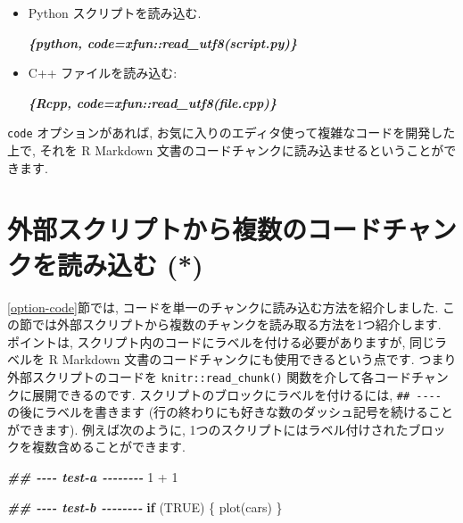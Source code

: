 \documentclass[
  11pt,
  lualatex,
  ja=standard]{bxjsreport}
\newenvironment{Shaded}{\begin{snugshade}}{\end{snugshade}}
\newcommand{\ConstantTok}[1]{\textcolor[rgb]{0.00,0.00,0.00}{#1}}
\newcommand{\ControlFlowTok}[1]{\textcolor[rgb]{0.13,0.29,0.53}{\textbf{#1}}}
\newcommand{\DecValTok}[1]{\textcolor[rgb]{0.00,0.00,0.81}{#1}}
\newcommand{\DocumentationTok}[1]{\textcolor[rgb]{0.56,0.35,0.01}{\textbf{\textit{#1}}}}
\newcommand{\FunctionTok}[1]{\textcolor[rgb]{0.00,0.00,0.00}{#1}}
\newcommand{\InformationTok}[1]{\textcolor[rgb]{0.56,0.35,0.01}{\textbf{\textit{#1}}}}
\newcommand{\NormalTok}[1]{#1}
\newcommand{\SpecialCharTok}[1]{\textcolor[rgb]{0.00,0.00,0.00}{#1}}
\begin{document}
\begin{itemize}
\item
  Python スクリプトを読み込む.

\begin{Shaded}
\begin{Highlighting}[]
\InformationTok{\textasciigrave{}\textasciigrave{}\textasciigrave{}\{python, code=xfun::read\_utf8(\textquotesingle{}script.py\textquotesingle{})\}}
\InformationTok{\textasciigrave{}\textasciigrave{}\textasciigrave{}}
\end{Highlighting}
\end{Shaded}
\item
  C++ ファイルを読み込む:

\begin{Shaded}
\begin{Highlighting}[]
\InformationTok{\textasciigrave{}\textasciigrave{}\textasciigrave{}\{Rcpp, code=xfun::read\_utf8(\textquotesingle{}file.cpp\textquotesingle{})\}}
\InformationTok{\textasciigrave{}\textasciigrave{}\textasciigrave{}}
\end{Highlighting}
\end{Shaded}
\end{itemize}

\texttt{code} オプションがあれば, お気に入りのエディタ使って複雑なコードを開発した上で, それを R Markdown 文書のコードチャンクに読み込ませるということができます.

\hypertarget{read-chunk}{%
\section{外部スクリプトから複数のコードチャンクを読み込む (*)}\label{read-chunk}}

\ref{option-code}節では, コードを単一のチャンクに読み込む方法を紹介しました. この節では外部スクリプトから複数のチャンクを読み取る方法を1つ紹介します. ポイントは, スクリプト内のコードにラベルを付ける必要がありますが, 同じラベルを R Markdown 文書のコードチャンクにも使用できるという点です. つまり外部スクリプトのコードを \texttt{knitr::read\_chunk()} 関数を介して各コードチャンクに展開できるのです. スクリプトのブロックにラベルを付けるには, \texttt{\#\# -\/-\/-\/-} の後にラベルを書きます (行の終わりにも好きな数のダッシュ記号を続けることができます). 例えば次のように, 1つのスクリプトにはラベル付けされたブロックを複数含めることができます.

\begin{Shaded}
\begin{Highlighting}[]
\DocumentationTok{\#\# {-}{-}{-}{-} test{-}a {-}{-}{-}{-}{-}{-}{-}{-}}
\DecValTok{1} \SpecialCharTok{+} \DecValTok{1}

\DocumentationTok{\#\# {-}{-}{-}{-} test{-}b {-}{-}{-}{-}{-}{-}{-}{-}}
\ControlFlowTok{if}\NormalTok{ (}\ConstantTok{TRUE}\NormalTok{) \{}
  \FunctionTok{plot}\NormalTok{(cars)}
\NormalTok{\}}
\end{Highlighting}
\end{Shaded}
\end{document}
